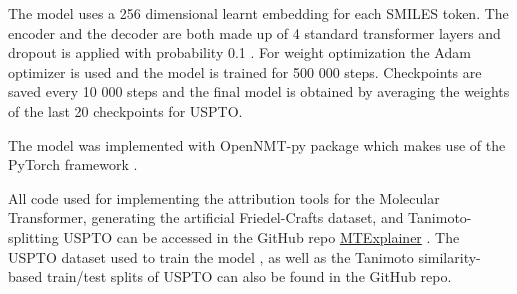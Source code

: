 The model uses a 256 dimensional learnt embedding for each SMILES token. The encoder and the decoder are both made up of 4 standard transformer layers and dropout is applied with probability 0.1 \cite{Srivastava2014dropout}. For weight optimization the Adam optimizer is used and the model is trained for 500 000 steps. Checkpoints are saved every 10 000 steps and the final model is obtained by averaging the weights of the last 20 checkpoints for USPTO.

The model was implemented with OpenNMT-py package \cite{Klein2017} which makes use of the PyTorch framework \cite{paszke2019pytorch}. 

All code used for implementing the attribution tools for the Molecular Transformer, generating the artificial Friedel-Crafts dataset, and Tanimoto-splitting USPTO can be accessed in the GitHub repo \href{https://github.com/davkovacs/MTExplainer.git}{MTExplainer} \cite{Kovacs2020MolecularExplainer}. The USPTO dataset used to train the model \cite{Lowe2012, Jin2017}, as well as the Tanimoto similarity-based train/test splits of USPTO can also be found in the GitHub repo.